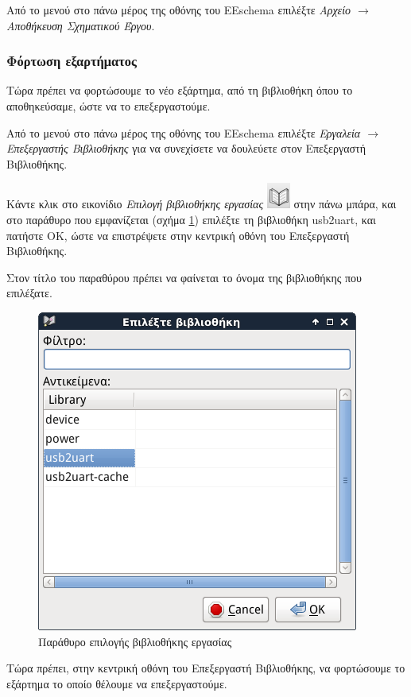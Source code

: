 \documentclass[a4paper]{article}
\begin{document}
Από το μενού στο πάνω μέρος της οθόνης του \textenglish{EEschema} επιλέξτε \textit{Αρχείο $\rightarrow$ Αποθήκευση Σχηματικού Έργου}.

\subsubsection{Φόρτωση εξαρτήματος}
Τώρα πρέπει να φορτώσουμε το νέο εξάρτημα, από τη βιβλιοθήκη όπου το αποθηκεύσαμε, ώστε να το επεξεργαστούμε.

Από το μενού στο πάνω μέρος της οθόνης του \textenglish{EEschema} επιλέξτε \textit{Εργαλεία $\rightarrow$ Επεξεργαστής Βιβλιοθήκης} για να συνεχίσετε να δουλεύετε στον Επεξεργαστή Βιβλιοθήκης.

Κάντε κλικ στο εικονίδιο \textit{Επιλογή βιβλιοθήκης εργασίας} \includegraphics[scale=.5]{img/libed-ico-selnewlib.png} στην πάνω μπάρα, και στο παράθυρο που εμφανίζεται (σχήμα \ref{fig:libed-dial-libsel}) επιλέξτε τη βιβλιοθήκη usb2uart, και πατήστε ΟΚ, ώστε να επιστρέψετε στην κεντρική οθόνη του Επεξεργαστή Βιβλιοθήκης. 

Στον τίτλο του παραθύρου πρέπει να φαίνεται το όνομα της βιβλιοθήκης που επιλέξατε.

\begin{figure}
  \begin{center}
    \includegraphics[width=.5\textwidth]{img/libed-dial-libsel.png}
    \caption{Παράθυρο επιλογής βιβλιοθήκης εργασίας}
    \label{fig:libed-dial-libsel}
  \end{center}
\end{figure}

Τώρα πρέπει, στην κεντρική οθόνη του Επεξεργαστή Βιβλιοθήκης, να φορτώσουμε το εξάρτημα το οποίο θέλουμε να επεξεργαστούμε. 
\end{document}

